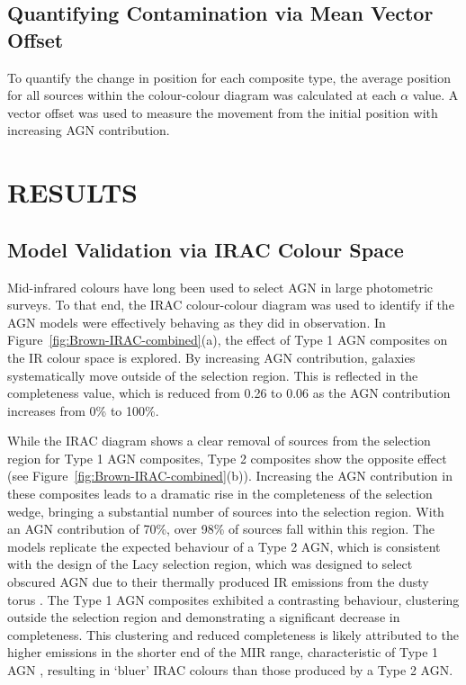 \documentclass[
  journal=pasa,
  manuscript=research-paper,
  year=202X,
  volume=YY,
]{cup-journal}
\begin{document}
\subsection{Quantifying Contamination via Mean Vector Offset}
\label{subsec:vectoroffset}

To quantify the change in position for each composite type, the average position for all sources within the colour-colour diagram was calculated at each $\alpha$ value. A vector offset was used to measure the movement from the initial position with increasing AGN contribution.

\section{RESULTS}
\label{sec:results}

\subsection{Model Validation via IRAC Colour Space}
\label{subsec:irac_results}

Mid-infrared colours have long been used to select AGN in large photometric surveys. To that end, the IRAC colour-colour diagram was used to identify if the AGN models were effectively behaving as they did in observation. In Figure~\ref{fig:Brown-IRAC-combined}(a), the effect of Type 1 AGN composites on the IR colour space is explored. By increasing AGN contribution, galaxies systematically move outside of the selection region. This is reflected in the completeness value, which is reduced from 0.26 to 0.06 as the AGN contribution increases from 0\% to 100\%.

While the IRAC diagram shows a clear removal of sources from the selection region for Type 1 AGN composites, Type 2 composites show the opposite effect (see Figure~\ref{fig:Brown-IRAC-combined}(b)). Increasing the AGN contribution in these composites leads to a dramatic rise in the completeness of the selection wedge, bringing a substantial number of sources into the selection region. With an AGN contribution of 70\%, over 98\% of sources fall within this region. The models replicate the expected behaviour of a Type 2 AGN, which is consistent with the design of the Lacy selection region, which was designed to select obscured AGN due to their thermally produced IR emissions from the dusty torus \citep{lacy_obscured_2004, lacy_optical_2007}. The Type 1 AGN composites exhibited a contrasting behaviour, clustering outside the selection region and demonstrating a significant decrease in completeness. This clustering and reduced completeness is likely attributed to the higher emissions in the shorter end of the MIR range, characteristic of Type 1 AGN \citep{thorne_deep_2022}, resulting in `bluer' IRAC colours than those produced by a Type 2 AGN.
\end{document}
